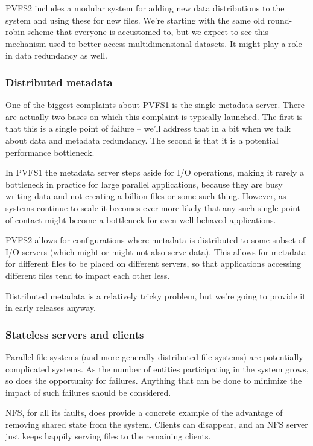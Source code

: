 PVFS2 includes a modular system for adding new data distributions to the
system and using these for new files.  We're starting with the same old
round-robin scheme that everyone is accustomed to, but we expect to see this
mechanism used to better access multidimensional datasets.  It might play a
role in data redundancy as well.

\subsubsection{Distributed metadata}

One of the biggest complaints about PVFS1 is the single metadata server.
There are actually two bases on which this complaint is typically launched.
The first is that this is a single point of failure -- we'll address that in a
bit when we talk about data and metadata redundancy.  The second is that it is
a potential performance bottleneck.

In PVFS1 the metadata server steps aside for I/O operations, making it rarely
a bottleneck in practice for large parallel applications, because they are
busy writing data and not creating a billion files or some such thing.
However, as systems continue to scale it becomes ever more likely that any
such single point of contact might become a bottleneck for even well-behaved
applications.

PVFS2 allows for configurations where metadata is distributed to some subset
of I/O servers (which might or might not also serve data).  This allows for
metadata for different files to be placed on different servers, so that
applications accessing different files tend to impact each other less.

Distributed metadata is a relatively tricky problem, but we're going to
provide it in early releases anyway.

\subsubsection{Stateless servers and clients}

Parallel file systems (and more generally distributed file systems) are
potentially complicated systems.  As the number of entities participating in
the system grows, so does the opportunity for failures.  Anything that can be
done to minimize the impact of such failures should be considered.

NFS, for all its faults, does provide a concrete example of the advantage of
removing shared state from the system.  Clients can disappear, and an NFS
server just keeps happily serving files to the remaining clients.

